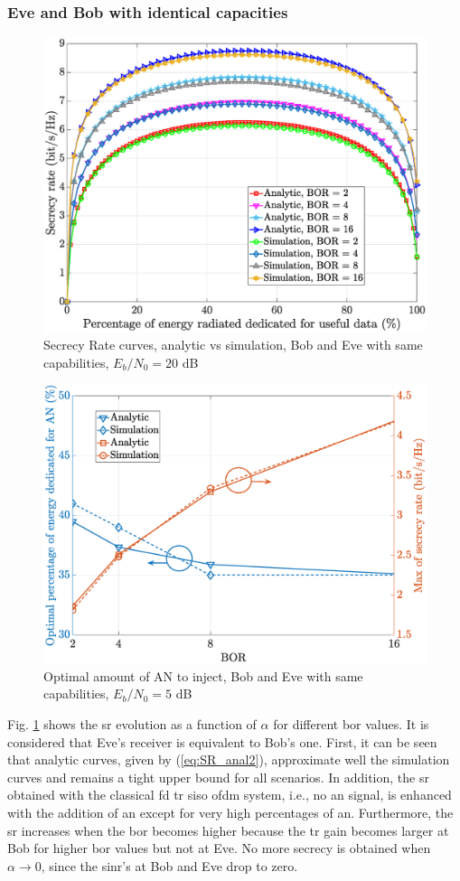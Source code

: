\subsubsection{Eve and Bob with identical capacities}
\label{subsubsec:sec_result_despreading}
\begin{figure}[ht!]
    \centering
    \centerline{\includegraphics[width = .65\textwidth]{graphs/SR_simu_anal_filt0.eps}}
    \caption{Secrecy Rate curves, analytic vs simulation, Bob and Eve with same capabilities, $E_b/N_0=20$ dB }
    \label{fig:secrecy_alpha_bor}
\end{figure}
\begin{figure}[ht!]
    \centering
    \centerline{\includegraphics[width = .65\textwidth]{graphs/SR_max.eps}}
    \caption{Optimal amount of AN to inject, Bob and Eve with same capabilities, $E_b/N_0=5$ dB }
    \label{fig:secrecy_alpha_bor_optimal}
\end{figure}
Fig. \ref{fig:secrecy_alpha_bor} shows the \gls{sr} evolution as a function of $\alpha$ for different \gls{bor} values. It is considered that Eve's receiver is equivalent to Bob's one. First, it can be seen that analytic curves, given by (\ref{eq:SR_anal2}), approximate well the simulation curves and remains a tight upper bound for all scenarios.  In addition, the \gls{sr} obtained with the classical \gls{fd} \gls{tr} \gls{siso} \gls{ofdm} system, i.e., no \gls{an} signal, is enhanced with the addition of \gls{an} except for very high percentages of \gls{an}. Furthermore, the \gls{sr} increases when the \gls{bor} becomes higher because the \gls{tr} gain becomes larger at Bob for higher \gls{bor} values but not at Eve. No more secrecy is obtained when $\alpha \to 0$, since the \gls{sinr}'s at Bob and Eve drop to zero.\\
